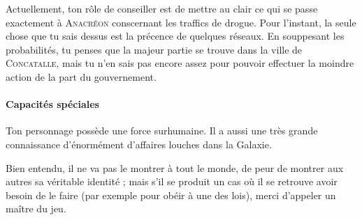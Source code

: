 \documentclass{article}
\begin{document}
{Actuellement, ton rôle de conseiller est de mettre au clair ce qui se passe exactement à \textsc{Anacréon} conscernant les traffics de drogue.
Pour l’instant, la seule chose que tu sais dessus est la précence de quelques réseaux.
En souppesant les probabilités, tu penses que la majeur partie se trouve dans la ville de \textsc{Concatalle}, mais tu n’en sais pas encore assez pour pouvoir effectuer la moindre action de la part du gouvernement.

\paragraph{Capacités spéciales}
{
Ton personnage possède une force surhumaine.
Il a aussi une très grande connaissance d’énormément d’affaires louches dans la Galaxie.

Bien entendu, il ne va pas le montrer à tout le monde, de peur de montrer aux autres sa véritable identité ; mais s’il se produit un cas où il se retrouve avoir besoin de le faire (par exemple pour obéir à une des lois), merci d’appeler un maître du jeu.
}
}
\end{document}
